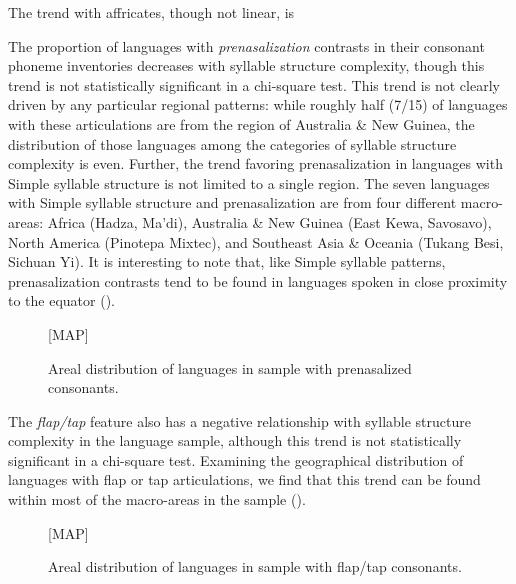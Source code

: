 The trend with affricates, though not linear, is 

  The proportion of languages with \textit{prenasalization} contrasts in their consonant phoneme inventories decreases with syllable structure complexity, though this trend is not statistically significant in a chi-square test. This trend is not clearly driven by any particular regional patterns: while roughly half (7/15) of languages with these articulations are from the region of Australia \& New Guinea, the distribution of those languages among the categories of syllable structure complexity is even. Further, the trend favoring prenasalization in languages with Simple syllable structure is not limited to a single region. The seven languages with Simple syllable structure and prenasalization are from four different macro-areas: Africa (Hadza, Ma’di), Australia \& New Guinea (East Kewa, Savosavo), North America (Pinotepa Mixtec), and Southeast Asia \& Oceania (Tukang Besi, Sichuan Yi). It is interesting to note that, like Simple syllable patterns, prenasalization contrasts tend to be found in languages spoken in close proximity to the equator ().


\begin{figure}  
{}[MAP]

\caption{\label{fig:4.15} Areal distribution of languages in sample with prenasalized consonants.}
\end{figure}

  The \textit{flap/tap} feature also has a negative relationship with syllable structure complexity in the language sample, although this trend is not statistically significant in a chi-square test. Examining the geographical distribution of languages with flap or tap articulations, we find that this trend can be found within most of the macro-areas in the sample ().


\begin{figure}  
{}[MAP]

\caption{\label{fig:4.16} Areal distribution of languages in sample with flap/tap consonants.}
\end{figure}

